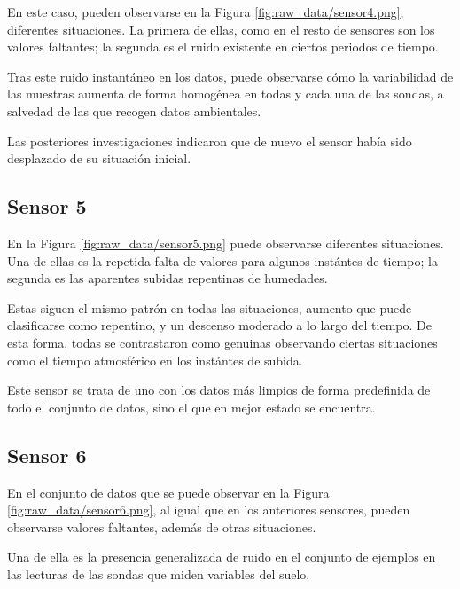 
En este caso, pueden observarse en la Figura \ref{fig:raw_data/sensor4.png}, diferentes
situaciones. La primera de ellas, como en el resto de sensores son los valores faltantes; la
segunda es el ruido existente en ciertos periodos de tiempo.

Tras este ruido instantáneo en los datos, puede observarse cómo la variabilidad de las muestras
aumenta de forma homogénea en todas y cada una de las sondas, a salvedad de las que recogen
datos ambientales.

Las posteriores investigaciones indicaron que de nuevo el sensor había sido desplazado
de su situación inicial.

\newpage
\subsection{Sensor 5}


En la Figura \ref{fig:raw_data/sensor5.png} puede observarse diferentes situaciones.
Una de ellas es la repetida falta de valores para algunos instántes de tiempo; la 
segunda es las aparentes subidas repentinas de humedades.

Estas siguen el mismo patrón en todas las situaciones, aumento que puede clasificarse
como repentino, y un descenso moderado a lo largo del tiempo.
De esta forma, todas se contrastaron como genuinas observando ciertas situaciones como
el tiempo atmosférico en los instántes de subida.

Este sensor se trata de uno con los datos más limpios de forma predefinida de todo
el conjunto de datos, sino el que en mejor estado se encuentra.

\newpage
\subsection{Sensor 6}


En el conjunto de datos que se puede observar en la Figura \ref{fig:raw_data/sensor6.png},
al igual que en los anteriores sensores, pueden observarse valores faltantes, además de 
otras situaciones.

Una de ella es la presencia generalizada de ruido en el conjunto de ejemplos en las lecturas
de las sondas que miden variables del suelo.

